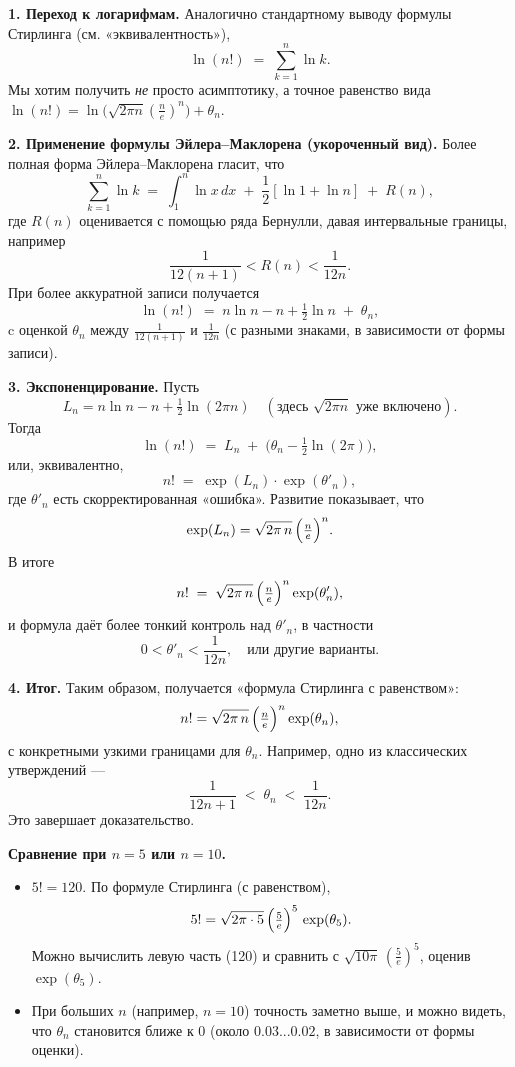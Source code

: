 \begin{customproof}
	\textbf{1. Переход к логарифмам.}
	Аналогично стандартному выводу формулы Стирлинга (см. «эквивалентность»),
	\[
		\ln(n!)
		\;=\;
		\sum_{k=1}^n \ln k.
	\]
	Мы хотим получить \emph{не} просто асимптотику, а точное равенство вида
	\(\ln(n!) = \ln\bigl(\sqrt{2\pi n}(\tfrac{n}{e})^n\bigr) + \theta_n\).

	\smallskip

	\textbf{2. Применение формулы Эйлера–Маклорена (укороченный вид).}
	Более полная форма Эйлера–Маклорена гласит, что
	\[
		\sum_{k=1}^n \ln k
		\;=\;
		\int_1^n \ln x\,dx
		\;+\; \frac12[\ln 1 + \ln n]
		\;+\; R(n),
	\]
	где $R(n)$ оценивается с помощью ряда Бернулли, давая интервальные границы, например
	\[
		\frac{1}{12(n+1)} < R(n) < \frac{1}{12n}.
	\]
	При более аккуратной записи получается
	\[
		\ln(n!)
		\;=\;
		n\ln n - n + \tfrac12\ln n
		\;+\; \theta_n,
	\]
	c оценкой \(\theta_n\) между \(\tfrac{1}{12(n+1)}\) и \(\tfrac{1}{12n}\) (с разными знаками, в зависимости от формы записи).

	\smallskip

	\textbf{3. Экспоненцирование.}
	Пусть
	\[
		L_n
		= n\ln n - n + \tfrac12\ln(2\pi n)
		\quad (\text{здесь } \sqrt{2\pi n} \text{ уже включено}).
	\]
	Тогда
	\[
		\ln(n!)
		\;=\;
		L_n
		\;+\;
		\bigl(\theta_n - \tfrac12\ln(2\pi)\bigr),
	\]
	или, эквивалентно,
	\[
		n!
		\;=\;
		\exp(L_n)
		\cdot \exp(\theta'_n),
	\]
	где $\theta'_n$ есть скорректированная «ошибка». Развитие показывает, что
	\[
		\exp(L_n)
		=
		\sqrt{2\pi\,n}\,\Bigl(\tfrac{n}{e}\Bigr)^n.
	\]
	В итоге
	\[
		n!
		\;=\;
		\sqrt{2\pi\,n}\,\Bigl(\tfrac{n}{e}\Bigr)^n
		\exp(\theta'_n),
	\]
	и формула даёт более тонкий контроль над $\theta'_n$, в частности
	\[
		0 < \theta'_n < \frac{1}{12n},\quad \text{или другие варианты}.
	\]

	\smallskip

	\textbf{4. Итог.}
	Таким образом, получается «формула Стирлинга с равенством»:
	\[
		n!
		=
		\sqrt{2\pi\,n}\,\Bigl(\tfrac{n}{e}\Bigr)^n \exp(\theta_n),
	\]
	с конкретными узкими границами для \(\theta_n\). Например, одно из классических утверждений —
	\[
		\frac{1}{12n+1}
		\;<\;
		\theta_n
		\;<\;
		\frac{1}{12n}.
	\]
	Это завершает доказательство.
\end{customproof}

\begin{customexample}
	\textbf{Сравнение при $n=5$ или $n=10$.}
	\begin{itemize}
		\item $5! = 120$.
		      По формуле Стирлинга (с равенством),
		      \[
			      5!
			      = \sqrt{2\pi\cdot 5}\,\Bigl(\tfrac{5}{e}\Bigr)^5 \,\exp(\theta_5).
		      \]
		      Можно вычислить левую часть (120) и сравнить с $\sqrt{10\pi}\,(\frac{5}{e})^5$,
		      оценив $\exp(\theta_5)$.
		\item При больших $n$ (например, $n=10$) точность заметно выше, и можно видеть,
		      что $\theta_n$ становится ближе к 0 (около $0.03$...$0.02$, в зависимости от
		      формы оценки).
	\end{itemize}
\end{customexample}
